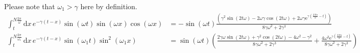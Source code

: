 \documentclass[10pts, letterpaper]{article}
\begin{document}
Please note that $\omega_1 > \gamma$ here by definition.  
\begin{align*}
	\int_{t}^{N \frac{2 \pi }{\omega}} \mathrm{d} x \, e^{- \gamma ( t- x) } \sin(\omega t) \sin(\omega x) \cos(\omega x) &=  - 
\sin( \omega t) 
\frac{
\left(
{\gamma} ^2
\sin\left(2t{\omega}\right) 
- 
2 {\omega} \gamma 
\cos\left(2t{\omega}\right) + 
2{\omega}\gamma \mathrm{e}^{\gamma \left(
\frac{2 N \pi{}}{\omega}  - t\right)} \right)}
{8\gamma{\omega}^{2} + 2 {\gamma}^{3}} 
\\
	\int_{t}^{N \frac{2 \pi }{\omega_1}}   \mathrm{d} x\, 
e^{ -\gamma (t-x)} \sin(\omega_1 t) \sin^2 (\omega_1 x) &=  
\sin\left({\omega} t\right) \left(\frac{2{\gamma}{\omega} \sin\left(2t{\omega}\right) + {\gamma}^{2} \cos\left(2t{\omega}\right) - 4{\omega}^{2} - {\gamma}^{2}}{8{\gamma}{\omega}^{2} + 2{\gamma}^{3}} + 
\frac{ 4 {\omega}^{2} 
\mathrm{e}^{\gamma\left(\frac{2N\pi{}}{\omega} - t \right)}}{{8{\gamma}}{ {\omega}^{2} + 2 {\gamma}^{3} } } \right)
\end{align*}
\end{document}
